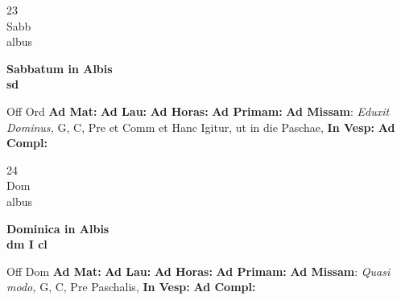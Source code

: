 \documentclass[10pt, openany]{book}
\begin{document}
        \begin{center}
            \begin{minipage}{3.5in}
                \vspace{2em}
                \begin{minipage}{0.5in}
                    {\Huge 23} \\
                    {\normalsize Sabb} \\
                    {\normalsize albus}
                \end{minipage}
                \begin{minipage}{3.0in}
                    \textbf{ \large Sabbatum in Albis \\
                    \textnormal{\normalsize sd}} \\ 
                \end{minipage}
                \begin{justify}Off Ord
                    \textbf{Ad Mat: }
                    \textbf{Ad Lau: }
                    \textbf{Ad Horas: }
                    \textbf{Ad Primam: }\textbf{Ad Missam}: \textit{Eduxit Dominus,} G, C, Pre et Comm et Hanc Igitur, ut in die Paschae,  
                    \textbf{In Vesp: }
                    \textbf{Ad Compl: }
                \end{justify}
            \end{minipage}
        \end{center}
    
        \begin{center}
            \begin{minipage}{3.5in}
                \vspace{2em}
                \begin{minipage}{0.5in}
                    {\Huge 24} \\
                    {\normalsize Dom} \\
                    {\normalsize albus}
                \end{minipage}
                \begin{minipage}{3.0in}
                    \textbf{ \large Dominica in Albis \\
                    \textnormal{\normalsize dm I cl}} \\ 
                \end{minipage}
                \begin{justify}Off Dom
                    \textbf{Ad Mat: }
                    \textbf{Ad Lau: }
                    \textbf{Ad Horas: }
                    \textbf{Ad Primam: }\textbf{Ad Missam}: \textit{Quasi modo,} G, C, Pre Paschalis,  
                    \textbf{In Vesp: }
                    \textbf{Ad Compl: }
                \end{justify}
            \end{minipage}
        \end{center}
    
\end{document}
